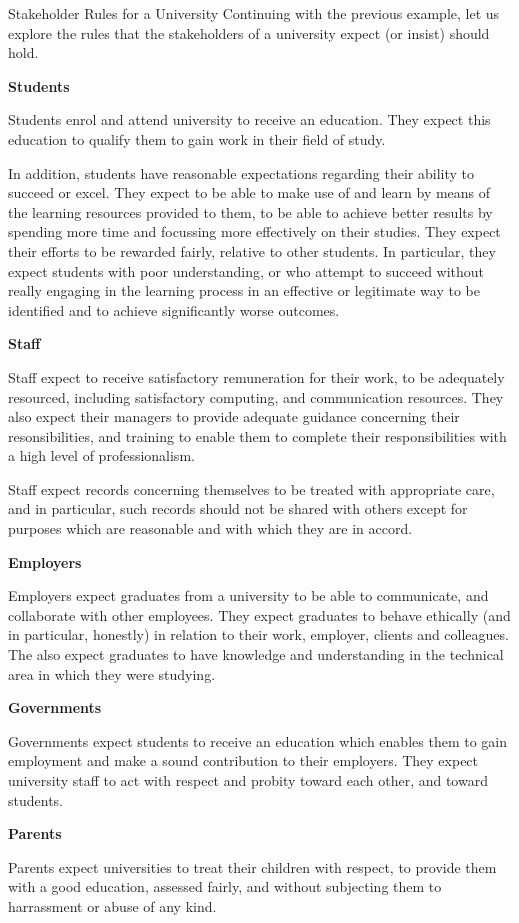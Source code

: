 \begin{sbexample}{Stakeholder Rules for a University}%
Continuing with the previous example, let us explore the rules that the stakeholders of a university
expect (or insist) should hold.

{\bf Students}

Students enrol and attend university to receive an education. They expect this education to qualify
them to gain work in their field of study. 

In addition, students have reasonable expectations regarding their ability to succeed or excel.
They expect to be able to make use of and learn by means of the learning resources provided to
them, to be able to achieve better results by spending more time and focussing more effectively
on their studies. They expect their efforts to be rewarded fairly, relative to other students.
In particular, they expect students with poor understanding, or who attempt to succeed without
really engaging in the learning process in an effective or legitimate way to be identified and
to achieve significantly worse outcomes.



{\bf Staff}

Staff expect to receive satisfactory remuneration for their work, to be adequately resourced,
including satisfactory computing, and communication resources. They also expect their managers
to provide adequate guidance concerning their resonsibilities, and training to enable them
to complete their responsibilities with a high level of professionalism.


Staff expect records concerning themselves to be treated with appropriate care, and in particular,
such records should not be shared with others except for purposes which are reasonable and 
with which they are in accord.

{\bf Employers}

Employers expect graduates from a university to be able to communicate, and collaborate with
other employees. They expect graduates to behave ethically (and in particular, honestly) in relation
to their work, employer, clients and colleagues. The also expect graduates to have knowledge
and understanding in the technical area in which they were studying.

{\bf Governments}

Governments expect students to receive an education which enables them to gain employment and
make a sound contribution to their employers. They expect university staff to act with respect and
probity toward each other, and toward students.

{\bf Parents}

Parents expect universities to treat their children with respect, to provide them with 
a good education, assessed fairly, and without subjecting them to harrassment or
abuse of any kind.

\end{sbexample}

